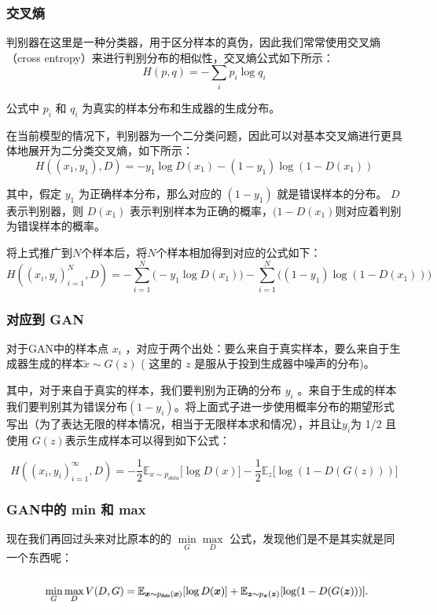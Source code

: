 \documentclass[12pt]{article}
\begin{document}
\subsubsection{交叉熵}
判别器在这里是一种分类器，用于区分样本的真伪，因此我们常常使用交叉熵（cross entropy）来进行判别分布的相似性，交叉熵公式如下所示：
$$
H(p,q) = -\sum_{i}p_i\log q_i
$$

公式中 $p_i$ 和 $q_i$ 为真实的样本分布和生成器的生成分布。

在当前模型的情况下，判别器为一个二分类问题，因此可以对基本交叉熵进行更具体地展开为二分类交叉熵，如下所示：
$$
H((x_1, y_1), D) = -y_1\log D(x_1) - (1-y_1)\log(1-D(x_1))
$$

其中，假定 $y_1$ 为正确样本分布，那么对应的 $(1-y_1)$ 就是错误样本的分布。 $D$ 表示判别器，则 $D(x_1)$ 表示判别样本为正确的概率，$(1-D(x_1)$则对应着判别为错误样本的概率。

将上式推广到$N$个样本后，将$N$个样本相加得到对应的公式如下：
$$
H((x_i, y_i)^N_{i=1}, D) = -\sum_{i=1}^N\Big(-y_1\log D(x_1)\Big)- \sum_{i=1}^N\Big((1-y_1)\log(1-D(x_1))\Big)
$$

\subsubsection{对应到 GAN}
对于GAN中的样本点 $x_i$ ，对应于两个出处：要么来自于真实样本，要么来自于生成器生成的样本$\tilde{x} \sim G(z)$ ( 这里的 $z$ 是服从于投到生成器中噪声的分布)。

其中，对于来自于真实的样本，我们要判别为正确的分布 $y_i$ 。来自于生成的样本我们要判别其为错误分布$(1-y_i)$。将上面式子进一步使用概率分布的期望形式写出（为了表达无限的样本情况，相当于无限样本求和情况），并且让$y_i$为 1/2 且使用 $G(z)$表示生成样本可以得到如下公式：

$$
H((x_i, y_i)^\infty_{i=1}, D) = -\frac{1}{2}\mathbb{E}_{x\sim p_{data}}\Big[\log D(x)\Big] - \frac{1}{2}\mathbb{E}_z\Big[\log(1-D(G(z)))\Big]
$$

\subsubsection{GAN中的 min 和 max}
现在我们再回过头来对比原本的的 $\min\limits_G \max\limits_D$ 公式，发现他们是不是其实就是同一个东西呢：
\begin{figure}[H]
    \centering
    \includegraphics[width=1\textwidth]{fig/GAN_Eq_Minmax.png}
\end{figure}
\end{document}
